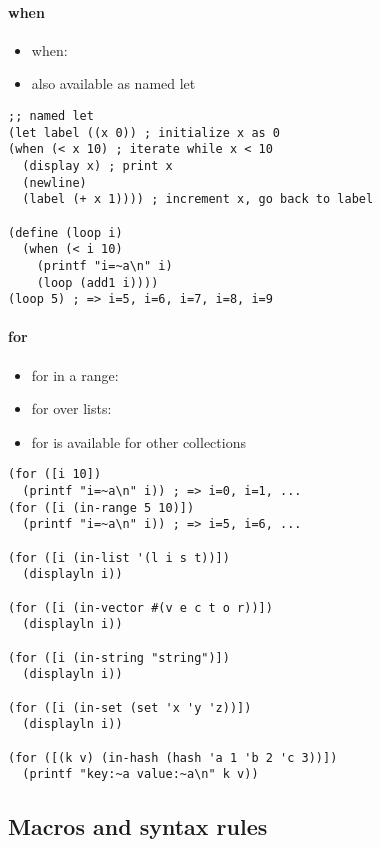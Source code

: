 \documentclass[a4paper,landscape,10pt]{article}
\begin{document}
\begin{multicols*}{2}
  \paragraph{when}

  \begin{itemize}
    \item when: 
    \item also available as named let
  \end{itemize}

  \begin{lstlisting}[language=Racket]
;; named let
(let label ((x 0)) ; initialize x as 0
(when (< x 10) ; iterate while x < 10
  (display x) ; print x
  (newline)
  (label (+ x 1)))) ; increment x, go back to label

(define (loop i)
  (when (< i 10)
    (printf "i=~a\n" i)
    (loop (add1 i))))
(loop 5) ; => i=5, i=6, i=7, i=8, i=9
  \end{lstlisting}

  \paragraph{for}

  \begin{itemize}
    \item for in a range: 
    \item for over lists: 
    \item for is available for other collections
  \end{itemize}

  \begin{lstlisting}[language=Racket]
(for ([i 10])
  (printf "i=~a\n" i)) ; => i=0, i=1, ...
(for ([i (in-range 5 10)])
  (printf "i=~a\n" i)) ; => i=5, i=6, ...

(for ([i (in-list '(l i s t))])
  (displayln i))

(for ([i (in-vector #(v e c t o r))])
  (displayln i))

(for ([i (in-string "string")])
  (displayln i))

(for ([i (in-set (set 'x 'y 'z))])
  (displayln i))

(for ([(k v) (in-hash (hash 'a 1 'b 2 'c 3))])
  (printf "key:~a value:~a\n" k v))
  \end{lstlisting}

  \subsection{Macros and syntax rules}


\end{multicols*}
\end{document}

